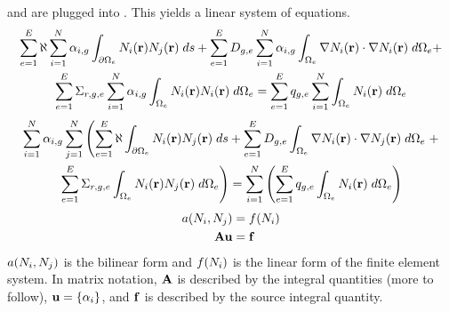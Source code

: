      and  are plugged
    into . This yields a linear system of equations.
    \begin{multline}
      \sum_{e=1}^{E} \aleph \sum_{i=1}^{N} \alpha_{i,g}
        \int_{\partial \Omega_e}
        N_i(\mathbf{r})  N_j(\mathbf{r}) \;ds +
        \sum_{e=1}^{E} D_{g,e} \sum_{i=1}^{N} \alpha_{i,g}
        \int_{\Omega_e} \mathbf{\nabla} N_i(\mathbf{r}) \cdot \mathbf{\nabla} N_i(\mathbf{r})\;d\Omega_e
        + \\
        \sum_{e=1}^{E} \Sigma_{r,g,e} \sum_{i=1}^{N} \alpha_{i,g}
        \int_{\Omega_e} N_i(\mathbf{r}) N_i(\mathbf{r}) \; d\Omega_e =
        \sum_{e=1}^{E} q_{g,e} \sum_{i=1}^{N} 
        \int_{\Omega_e} N_i(\mathbf{r}) \; d\Omega_e
    \end{multline}
    \begin{multline}
      \sum_{i=1}^{N} \alpha_{i,g} \sum_{j=1}^{N} \left(
        \sum_{e=1}^{E} \aleph \int_{\partial \Omega_e}
        N_i(\mathbf{r})  N_j(\mathbf{r}) \;ds +
        \sum_{e=1}^{E} D_{g,e} 
        \int_{\Omega_e} \mathbf{\nabla} N_i(\mathbf{r}) \cdot \mathbf{\nabla} N_j(\mathbf{r})\;d\Omega_e
        \right.
        + \\
        \left.
        \sum_{e=1}^{E} \Sigma_{r,g,e}
        \int_{\Omega_e} N_i(\mathbf{r}) N_j(\mathbf{r}) \; d\Omega_e \right) =
        \sum_{i=1}^{N} \left(
        \sum_{e=1}^{E} q_{g,e} 
        \int_{\Omega_e} N_i(\mathbf{r}) \; d\Omega_e \right)
    \end{multline}
    \begin{align}
      a(N_i,N_j) &= f(N_i) \\
      \mathbf{A} \mathbf{u} &= \mathbf{f}
    \end{align}
    $a(N_i,N_j)$ is the bilinear form and $f(N_i)$ is the linear 
    form of the finite element system. In matrix notation, $\mathbf{A}$ is described 
    by the integral quantities (more to follow),  $\mathbf{u} = \{\alpha_i\}$, and
    $\mathbf{f}$ is described by the source integral quantity.
    
